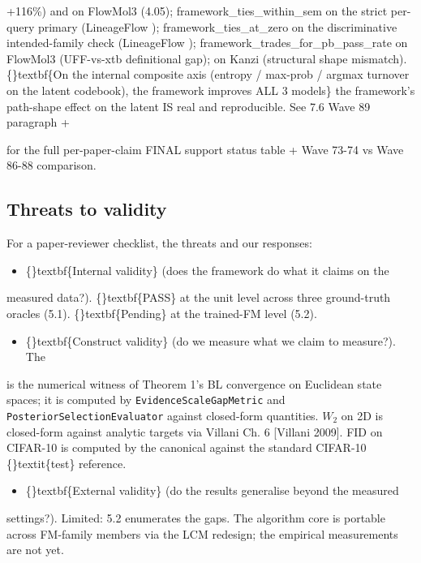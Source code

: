 \documentclass{article}
\begin{document}
 +116\%) and on FlowMol3  (4.05); framework\_ties\_within\_sem on the strict per-query primary (LineageFlow ); framework\_ties\_at\_zero on the discriminative intended-family check (LineageFlow ); framework\_trades\_for\_pb\_pass\_rate on FlowMol3  (UFF-vs-xtb definitional gap);  on Kanzi (structural shape mismatch). \{\}textbf\{On the internal composite axis (entropy / max-prob / argmax turnover on the latent codebook), the framework improves ALL 3 models\}  the framework's path-shape effect on the latent IS real and reproducible. See 7.6 Wave 89 paragraph +

 for the full per-paper-claim FINAL support status table + Wave 73-74 vs Wave 86-88 comparison.

\subsection{Threats to validity}
For a paper-reviewer checklist, the threats and our responses:

\begin{itemize}
\item \{\}textbf\{Internal validity\} (does the framework do what it claims on the
\end{itemize}
measured data?). \{\}textbf\{PASS\} at the unit level across three ground-truth oracles (5.1). \{\}textbf\{Pending\} at the trained-FM level (5.2).

\begin{itemize}
\item \{\}textbf\{Construct validity\} (do we measure what we claim to measure?). The
\end{itemize}
 is the numerical witness of Theorem 1's BL convergence on Euclidean state spaces; it is computed by \texttt{EvidenceScaleGapMetric} and \texttt{PosteriorSelectionEvaluator} against closed-form quantities. $W_2$ on 2D is closed-form against analytic targets via Villani Ch. 6 [Villani 2009]. FID on CIFAR-10 is computed by the canonical  against the standard CIFAR-10 \{\}textit\{test\} reference.

\begin{itemize}
\item \{\}textbf\{External validity\} (do the results generalise beyond the measured
\end{itemize}
settings?). Limited: 5.2 enumerates the gaps. The algorithm core is portable across FM-family members via the LCM redesign; the empirical measurements are not yet.
\end{document}
